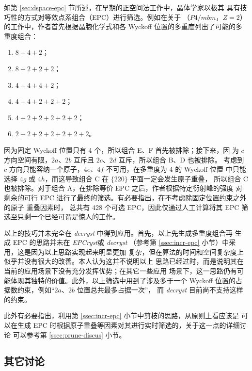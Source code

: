 如第 \ref{sec:dspace-epc} 节所述，在早期的正空间法工作中，晶体学家以极其
具有技巧性的方式对等效点系组合（EPC）进行筛选。例如在\textcite{lu1965}关于
（$P4/mbm$，$Z = 2$）的工作中，作者首先根据晶胞化学式和各 Wyckoff
位置的多重度列出了可能的多重度组合：
\begin{multicols}{2}
\begin{enumerate}[label = {\Alph*.}, leftmargin = 2\parindent]
	\item $8 + 4 + 2$；
	\item $8 + 2 + 2 + 2$；
	\item $4 + 4 + 4 + 2$；
	\item $4 + 4 + 2 + 2 + 2$；
	\item $4 + 2 + 2 + 2 + 2 + 2$；
	\item $2 + 2 + 2 + 2 + 2 + 2 + 2$。
\end{enumerate}
\end{multicols}
{\noindent}因为固定 Wyckoff 位置只有 4 个，所以组合 E、F 首先被排除；接下来，因
为 $c$ 方向空间有限，$2a$、$2b$ 互斥且 $2c$、$2d$ 互斥，所以组合 B、D 也被排除。
考虑到 $c$ 方向只能容纳一个原子，$4e$、$4f$ 不可用，在多重度为 4 的 Wyckoff 位置
中只能选择 $4g$ 或 $4h$，而这导致组合 C 在 $\{220\}$ 平面一定会发生原子重叠，
所以组合 C 也被排除。对于组合 A，在排除等价 EPC 之后，作者根据特定衍射峰的强度
对剩余的可行 EPC 进行了最终的筛选。有必要指出，在不考虑除固定位置约束之外的原子
重叠因素时， 总共有 428 个可选 EPC，因此仅通过人工计算将其
EPC 筛选至只剩一个已经可谓是惊人的工作。

以上的技巧并未完全在 \emph{decryst} 中得到应用。首先，以上先生成多重度组合再
生成 EPC 的思路并未在 \emph{EPCryst}\parencite{deng2011}或 \emph{decryst}%
（参考第 \ref{ssec:incr-epc} 小节）中采用，这是因为以上思路实现起来明显更加
复杂，但在算法的时间和空间复杂度上似乎并没有很大的改善。本人认为这并不说明以上
思路已经过时，而是说明其在当前的应用场景下没有充分发挥优势；在其它一些应用
场景下，这一思路仍有可能体现其独特的价值。此外，以上筛选中用到了涉及多于一个
Wyckoff 位置的占据数约束，例如“$2a$、$2b$ 位置总共最多占据一次”，
而 \emph{decryst} 目前尚不支持这样的约束。

此外有必要指出，利用第 \ref{ssec:incr-epc} 小节中剪枝的思路，从原则上看应该是
可以在生成 EPC 时根据原子重叠等因素对其进行实时筛选的，关于这一点的详细讨论
可以参考第 \ref{ssec:prune-discus} 小节。

\subsection{其它讨论}


